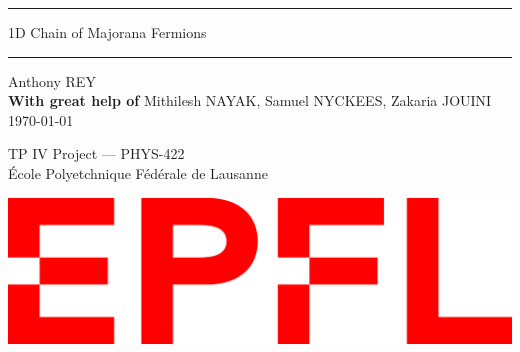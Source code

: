 \documentclass[11pt, fleqn]{article}
\begin{document}
\titleformat{\section}{\centering\Huge\bfseries\sffamily\color{RedViolet}}{}{0em}{\MakeUppercase}{}
\titleformat{\subsection}{\Large\bfseries\sffamily\color{RedViolet}}{\hspace{0.5cm}{\color{gray}\textbar}\hspace{0.2cm}}{0em}{}{}

\begin{titlepage}
    \begin{center}    

        \mbox{}    
        \vspace{2cm}
        \begin{center}
            \rule{8cm}{1pt}
        \end{center}
        \vspace{1cm}
        {\Huge\sffamily\color{RedViolet} 1D Chain of Majorana Fermions}
        \vspace{0.7cm}
        \begin{center}
            \rule{8cm}{1pt}
        \end{center}
        \vspace{5 cm}
        
        {\Large\sffamily Anthony REY}\\        
        \vspace{0.5cm}
        {\large\sffamily\textbf{With great help of} Mithilesh NAYAK, Samuel NYCKEES, Zakaria JOUINI}\\

        \vspace{3cm}
        {\Large\sffamily \today}

        \vspace{3cm}
        {\sffamily TP IV Project --- PHYS-422}\\
        {\sffamily \'Ecole Polyetchnique Fédérale de Lausanne}

        \vfill
        \includegraphics[scale=0.03]{../images/logo.png}
        
    \end{center}
\end{titlepage}

\tableofcontents







\printbibliography
\end{document}
